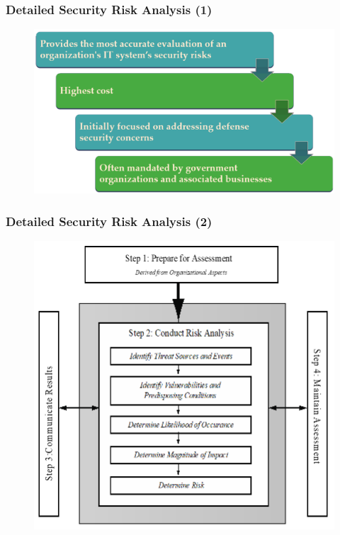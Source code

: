 \documentclass[xcolor ={table,usenames,dvipsnames}]{beamer}
\theoremstyle{definition}
\begin{document}
	\begin{frame}
		\frametitle{Detailed Security Risk Analysis (1)}
		\begin{figure}[h!]
			\centering
			\includegraphics[scale=0.27]{img/img_09.PNG}
			\label{Interfacce di un CS}
		\end{figure}
		\end{frame}
	
	\begin{frame}
		\frametitle{Detailed Security Risk Analysis (2)}
		\begin{figure}[h!]
			\centering
			\includegraphics[scale=0.47]{img/img_10.PNG}
			\label{Interfacce di un CS}
		\end{figure}
	\end{frame}
	
\end{document}
